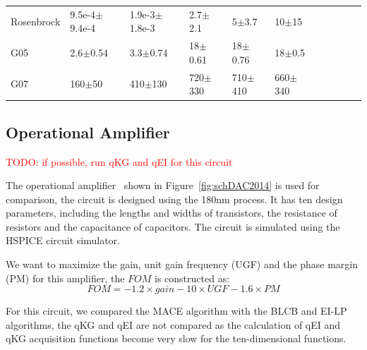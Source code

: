 \begin{table}[t]
\begin{tabular}{lllllllllll}
        Rosenbrock  &  9.5e-4$\pm$9.4e-4    &  1.9e-3$\pm$1.8e-3    &  2.7$\pm$2.1          &  5$\pm$3.7     &  10$\pm$15            \\
        G05         &  2.6$\pm$0.54         &  3.3$\pm$0.74         &  18$\pm$0.61          &  18$\pm$0.76   &  18$\pm$0.5           \\
        G07         &  160$\pm$50           &  410$\pm$130          &  720$\pm$330          &  710$\pm$410   &  660$\pm$340          \\
        \bottomrule
    \end{tabular}
\end{table}

\subsection{Operational Amplifier}


\textcolor{red}{TODO: if possible, run qKG and qEI for this circuit}

The operational amplifier~\cite{wang2014enabling} shown in
Figure~\ref{fig:schDAC2014} is used for comparison, the circuit is designed
using the 180nm process. It has ten design parameters, including the lengths
and widths of transistors, the resistance of resistors and the capacitance of
capacitors. The circuit is simulated using the HSPICE circuit simulator.

We want to maximize the gain, unit gain frequency (UGF) and the phase margin (PM) for this amplifier, the $FOM$ is constructed as:
$$
\mathit{FOM} = -1.2 \times \mathit{gain} - 10 \times \mathit{UGF} - 1.6 \times \mathit{PM}
$$

For this circuit, we compared the MACE algorithm with the BLCB and EI-LP
algorithms, the qKG and qEI are not compared as the calculation of qEI and qKG
acquisition functions become very slow for the ten-dimensional functions. 


